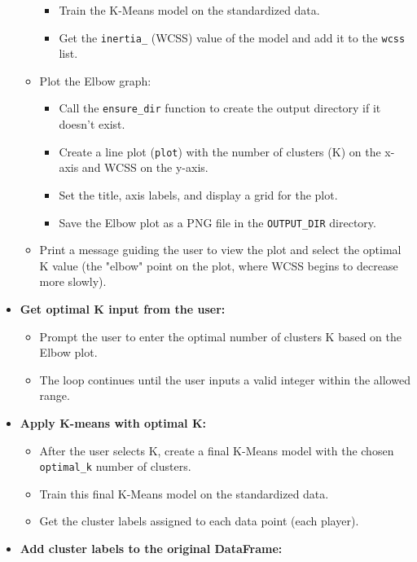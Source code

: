 \documentclass[12pt, a4paper]{report}
\begin{document}
\begin{itemize}
\begin{itemize}
\begin{itemize}
            \item Train the K-Means model on the standardized data.
            \item Get the \texttt{inertia\_} (WCSS) value of the model and add it to the \texttt{wcss} list.
        \end{itemize}
        \item Plot the Elbow graph:
        \begin{itemize}
            \item Call the \texttt{ensure\_dir} function to create the output directory if it doesn't exist.
            \item Create a line plot (\texttt{plot}) with the number of clusters (K) on the x-axis and WCSS on the y-axis.
            \item Set the title, axis labels, and display a grid for the plot.
            \item Save the Elbow plot as a PNG file in the \texttt{OUTPUT\_DIR} directory.
        \end{itemize}
        \item Print a message guiding the user to view the plot and select the optimal K value (the "elbow" point on the plot, where WCSS begins to decrease more slowly).
    \end{itemize}
    \item \textbf{Get optimal K input from the user:}
    \begin{itemize}
        \item Prompt the user to enter the optimal number of clusters K based on the Elbow plot.
        \item The loop continues until the user inputs a valid integer within the allowed range.
    \end{itemize}
    \item \textbf{Apply K-means with optimal K:}
    \begin{itemize}
        \item After the user selects K, create a final K-Means model with the chosen \texttt{optimal\_k} number of clusters.
        \item Train this final K-Means model on the standardized data.
        \item Get the cluster labels assigned to each data point (each player).
    \end{itemize}
    \item \textbf{Add cluster labels to the original DataFrame:}
    \begin{itemize}

\end{itemize}
\end{itemize}
\end{document}
